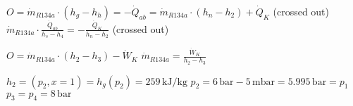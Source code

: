 \( O = \dot{m}_{R134a} \cdot (h_g - h_h) = - \dot{Q}_{ab} = \dot{m}_{R134a} \cdot (h_n - h_2) + \dot{Q}_K \) (crossed out)  
\( \dot{m}_{R134a} \cdot \frac{\dot{Q}_{ab}}{h_s - h_4} = - \frac{\dot{Q}_K}{h_n - h_2} \) (crossed out)  

\( O = \dot{m}_{R134a} \cdot (h_2 - h_3) - \dot{W}_K \)  
\( \dot{m}_{R134a} = \frac{\dot{W}_K}{h_2 - h_3} \)  

\( h_2 = (p_2, x = 1) = h_g(p_2) = 259 \, \text{kJ/kg} \)  
\( p_2 = 6 \, \text{bar} - 5 \, \text{mbar} = 5.995 \, \text{bar} = p_1 \)  
\( p_3 = p_4 = 8 \, \text{bar} \)